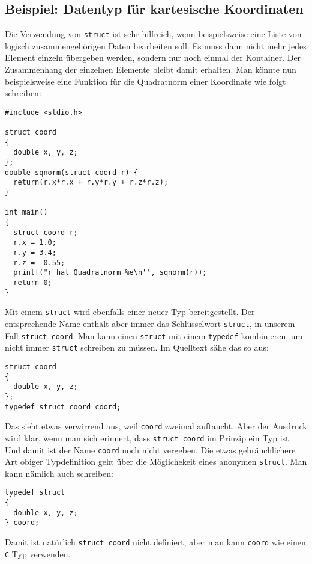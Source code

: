 \subsection{Beispiel: Datentyp für kartesische Koordinaten}

Die Verwendung von \verb|struct| ist sehr hilfreich, wenn beispielsweise eine Liste von logisch zusammengehörigen Daten bearbeiten soll.
Es muss dann nicht mehr jedes Element einzeln übergeben werden, sondern nur noch einmal der Kontainer.
Der Zusammenhang der einzelnen Elemente bleibt damit erhalten.
Man könnte nun beispielsweise eine Funktion für die Quadratnorm einer Koordinate wie folgt schreiben:
\begin{lstlisting}
#include <stdio.h>

struct coord
{
  double x, y, z;
};
double sqnorm(struct coord r) {
  return(r.x*r.x + r.y*r.y + r.z*r.z);
}

int main()
{
  struct coord r;
  r.x = 1.0;
  r.y = 3.4;
  r.z = -0.55;
  printf("r hat Quadratnorm %e\n'', sqnorm(r));
  return 0;
}
\end{lstlisting}
Mit einem \verb|struct| wird ebenfalls einer neuer Typ bereitgestellt.
Der entsprechende Name enthält aber immer das Schlüsselwort \verb|struct|, in unserem Fall \verb|struct coord|. 
Man kann einen \verb|struct| mit einem \verb|typedef| kombinieren, um nicht immer \verb|struct| schreiben zu müssen.
Im Quelltext sähe das so aus:
\begin{lstlisting}
struct coord
{
  double x, y, z;
};
typedef struct coord coord;
\end{lstlisting}
Das sieht etwas verwirrend aus, weil \verb|coord| zweimal auftaucht.
Aber der Ausdruck wird klar, wenn man sich erinnert, dass \verb|struct coord| im Prinzip ein Typ ist.
Und damit ist der Name \verb|coord| noch nicht vergeben.
Die etwas gebräuchlichere Art obiger Typdefinition geht über die Möglichekeit eines anonymen \verb|struct|.
Man kann nämlich auch schreiben:
\begin{lstlisting}
typedef struct
{
  double x, y, z;
} coord;
\end{lstlisting}
Damit ist natürlich \verb|struct coord| nicht definiert, aber man kann \verb|coord| wie einen \texttt{C} Typ verwenden.


\endinput

